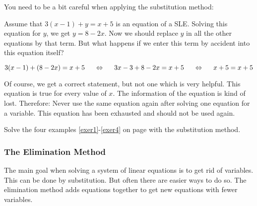 \vsp

\begin{remark}
You need to be a bit careful when applying the substitution method:

Assume that $3(x-1)+y=x+5$ is an equation of a SLE. Solving this equation for $y$, we get $y=8-2x$. Now we should replace $y$ in all the other equations by that term. But what happens if we enter this term by accident into this equation itself?

\[
3(x-1)+(8-2x)=x+5 \hspace{5mm}\Leftrightarrow\hspace{5mm} 3x-3+8-2x=x+5 \hspace{5mm}\Leftrightarrow\hspace{5mm} x+5=x+5
\]

Of course, we get a correct statement, but not one which is very helpful. This equation is true for every value of $x$. The information of the equation is kind of lost. Therefore: Never use the same equation again after solving one equation for a variable. This equation has been exhausted and should not be used again. 
\end{remark}
\vsp\vsp

\begin{exer}
Solve the four examples \ref{exer1}-\ref{exer4} on page \pageref{Einleitungsbeispiele} with the substitution method.
\end{exer}

\newpage


\subsubsection{The Elimination Method}
The main goal when solving a system of linear equations is to get rid of variables. This can be done by substitution. But often there are easier ways to do so. The elimination method adds equations together to get new equations with fewer variables. 

